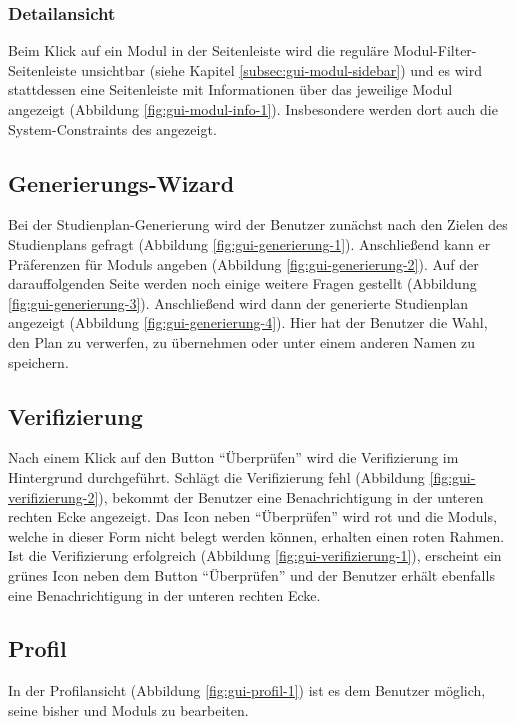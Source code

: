 \subsubsection{Detailansicht}
Beim Klick auf ein Modul in der Seitenleiste wird die reguläre Modul-Filter-Seitenleiste unsichtbar (siehe Kapitel \ref{subsec:gui-modul-sidebar}) und es wird stattdessen eine Seitenleiste mit Informationen über das jeweilige Modul angezeigt (Abbildung \ref{fig:gui-modul-info-1}). Insbesondere werden dort auch die \glspl{System-Constraint} des  angezeigt.



\subsection{Generierungs-Wizard}
\label{subsec:gui-generierung}
Bei der Studienplan-Generierung wird der \gls{Benutzer} zunächst nach den Zielen des Studienplans gefragt (Abbildung \ref{fig:gui-generierung-1}). Anschließend kann er Präferenzen für \glspl{Modul} angeben (Abbildung \ref{fig:gui-generierung-2}). Auf der darauffolgenden Seite werden noch einige weitere Fragen gestellt (Abbildung \ref{fig:gui-generierung-3}). Anschließend wird dann der generierte Studienplan angezeigt (Abbildung \ref{fig:gui-generierung-4}). Hier hat der \gls{Benutzer} die Wahl, den Plan zu verwerfen, zu übernehmen oder unter einem anderen Namen zu speichern.


\subsection{Verifizierung}
\label{subsec:gui-verifizierung}
Nach einem Klick auf den Button \enquote{Überprüfen} wird die Verifizierung im Hintergrund durchgeführt.\newline
Schlägt die Verifizierung fehl (Abbildung \ref{fig:gui-verifizierung-2}), bekommt der \gls{Benutzer} eine Benachrichtigung in der unteren rechten Ecke angezeigt. Das Icon neben \enquote{Überprüfen} wird rot und die \glspl{Modul}, welche in dieser Form nicht belegt werden können, erhalten einen roten Rahmen.\newline
Ist die Verifizierung erfolgreich (Abbildung \ref{fig:gui-verifizierung-1}), erscheint ein grünes Icon neben dem Button \enquote{Überprüfen} und der \gls{Benutzer} erhält ebenfalls eine Benachrichtigung in der unteren rechten Ecke.


\subsection{Profil}
In der Profilansicht (Abbildung \ref{fig:gui-profil-1}) ist es dem Benutzer möglich, seine bisher  und  \glspl{Modul} zu bearbeiten.
